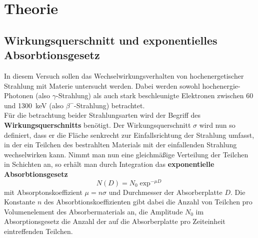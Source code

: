 \maketitle
\tableofcontents
\newpage
\section{Theorie}
\subsection{Wirkungsquerschnitt und exponentielles Absorbtionsgesetz}

In diesem Versuch sollen das Wechselwirkungsverhalten von hochenergetischer Strahlung
mit Materie untersucht werden. Dabei werden sowohl hochenergie-Photonen (also $\gamma$-Strahlung)
als auch stark beschleunigte Elektronen zwischen \num{60} und \SI{1300}{\kilo\electronvolt}
(also $\beta^-$-Strahlung) betrachtet.\\
Für die betrachtung beider Strahlungsarten wird der Begriff des \textbf{Wirkungsquerschnitts}
benötigt. Der Wirkungsquerschnitt $\sigma$ wird nun so definiert, dass er die Fläche senkrecht
zur Einfallsrichtung der Strahlung umfasst, in der ein Teilchen des bestrahlten Materials
mit der einfallenden Strahlung wechselwirken kann. Nimmt man nun eine gleichmäßige
Verteilung der Teilchen in Schichten an, so erhält man durch Integration das \textbf{exponentielle
Absorbtionsgesetz}
\begin{equation}
  N(D) = N_0 \exp^{-\mu D}
  \label{eqn:1}
\end{equation}
mit Absorptonskoeffizient $\mu = n \sigma$ und Durchmesser der Absorberplatte $D$.
Die Konstante $n$ des Absorbtionskoeffizienten gibt dabei die Anzahl von Teilchen
pro Volumenelement des Absorbermaterials an, die Amplitude $N_0$ im Absorptionsgesetz die
Anzahl der auf die Absorberplatte pro Zeiteinheit eintreffenden Teilchen.

